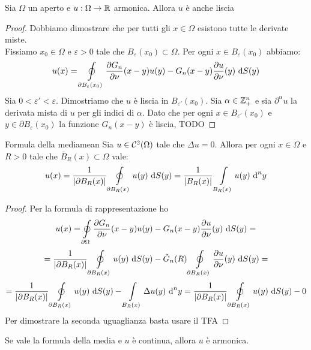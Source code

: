 \documentclass{book}
\begin{document}
\begin{theorem}{}{}
    Sia $\Omega$ un aperto e $u:\Omega \to \mathbb{R}$ armonica. Allora $u$ è anche liscia
\end{theorem}
\begin{proof}
    Dobbiamo dimostrare che per tutti gli $x\in\Omega$ esistono tutte le derivate miste.\\
    Fissiamo $x_0 \in \Omega $ e $\varepsilon>0$ tale che $B_\varepsilon(x_0)\subset\Omega$. Per ogni $x \in B_\varepsilon(x_0)$ abbiamo:
    \[u(x) = \oint\limits_{\partial B_\varepsilon(x_0)} \frac{\partial G_n}{\partial \nu}(x-y) u(y) - G_n(x-y)\frac{\partial u}{\partial \nu}(y) \text{ d} S(y)\]
    Sia $0<\varepsilon' < \varepsilon$. Dimostriamo che $u$ è liscia in $B_{\varepsilon'}(x_0)$.
    Sia $\alpha \in \mathbb{Z}_+^n$ e sia $\partial^\alpha u$ la derivata mista di $u$ per gli indici di $\alpha$. Dato che per ogni $x \in B_{\varepsilon'}(x_0)$ e $y \in \partial B_\varepsilon(x_0)$ la funzione $G_n(x-y)$ è liscia, 
    TODO
\end{proof}

\begin{theorem}{Formula della media}{mean}
    Sia $u \in \mathcal{C}^2(\Omega)$ tale che $\Delta u = 0$. Allora per ogni $x \in \Omega$ e $R>0$ tale che $\bar{B}_R(x)\subset \Omega$ vale:
    \[u(x) = \frac{1}{|\partial B_R(x)|}\oint\limits_{\partial B_R(x)}u(y) \text{ d} S(y) = \frac{1}{| B_R(x)|}\int\limits_{B_R(x)}u(y)\text{ d}^n y\] 
\end{theorem}
\begin{proof}
    Per la formula di rappresentazione ho
    \[u(x) = \oint\limits_{\partial\Omega} \frac{\partial G_n}{\partial \nu}(x-y) u(y) - G_n(x-y)\frac{\partial u}{\partial \nu}(y) \text{ d} S(y) =\]
    \[= \frac{1}{|\partial B_R(x)|}\oint\limits_{\partial B_R(x)}u(y) \text{ d} S(y) - \tilde{G}_n(R) \oint\limits_{\partial B_R(x)} \frac{\partial u}{\partial \nu}(y) \text{ d} S(y) =\]\[= \frac{1}{|\partial B_R(x)|}\oint\limits_{\partial B_R(x)}u(y) \text{ d} S(y) - \int\limits_{B_R(x)} \Delta u (y)\text{ d}^n y = \frac{1}{|\partial B_R(x)|}\oint\limits_{\partial B_R(x)}u(y) \text{ d} S(y) - 0\]
    Per dimostrare la seconda uguaglianza basta usare il TFA
\end{proof}
\begin{remark}{}{}
    Se vale la formula della media e $u$ è continua, allora $u$ è armonica.
\end{remark}
\end{document}
